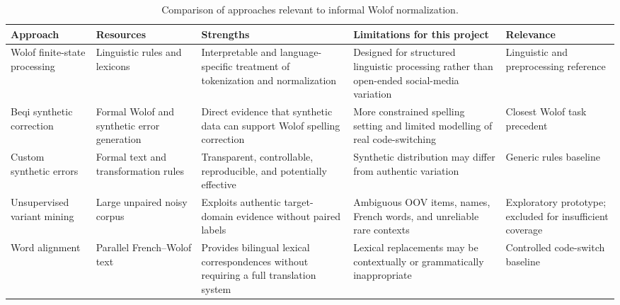 \documentclass[12pt, a4paper, twoside, openany]{report}
\begin{document}
\begin{table}[H]
	\centering
	\caption{Comparison of approaches relevant to informal Wolof normalization.}
	\label{tab:sota-comparison}
	\scriptsize
	\renewcommand{\arraystretch}{1.20}
	\begin{tabularx}{\textwidth}{
			>{\raggedright\arraybackslash}p{2.45cm}
			>{\raggedright\arraybackslash}p{2.25cm}
			>{\raggedright\arraybackslash}X
			>{\raggedright\arraybackslash}X
			>{\raggedright\arraybackslash}p{2.65cm}
		}
		\toprule
		\textbf{Approach} &
		\textbf{Resources} &
		\textbf{Strengths} &
		\textbf{Limitations for this project} &
		\textbf{Relevance} \\
		\midrule

		Wolof finite-state processing~\cite{dione2017tokenization} &
		Linguistic rules and lexicons &
		Interpretable and language-specific treatment of tokenization and normalization &
		Designed for structured linguistic processing rather than open-ended social-media variation &
		Linguistic and preprocessing reference \\

		\addlinespace

		Beqi synthetic correction~\cite{mbaye2025beqi} &
		Formal Wolof and synthetic error generation &
		Direct evidence that synthetic data can support Wolof spelling correction &
		More constrained spelling setting and limited modelling of real code-switching &
		Closest Wolof task precedent \\

		\addlinespace

		Custom synthetic errors~\cite{dekker2020synthetic} &
		Formal text and transformation rules &
		Transparent, controllable, reproducible, and potentially effective &
		Synthetic distribution may differ from authentic variation &
		Generic rules baseline \\

		\addlinespace

		Unsupervised variant mining~\cite{gouws2011lexical,li2014normalization,roy2021normalization} &
		Large unpaired noisy corpus &
		Exploits authentic target-domain evidence without paired labels &
		Ambiguous OOV items, names, French words, and unreliable rare contexts &
		Exploratory prototype; excluded for insufficient coverage \\

		\addlinespace

		Word alignment~\cite{brown1993statistical,ostling2016alignment} &
		Parallel French--Wolof text &
		Provides bilingual lexical correspondences without requiring a full translation system &
		Lexical replacements may be contextually or grammatically inappropriate &
		Controlled code-switch baseline \\


\end{tabularx}
\end{table}
\end{document}
